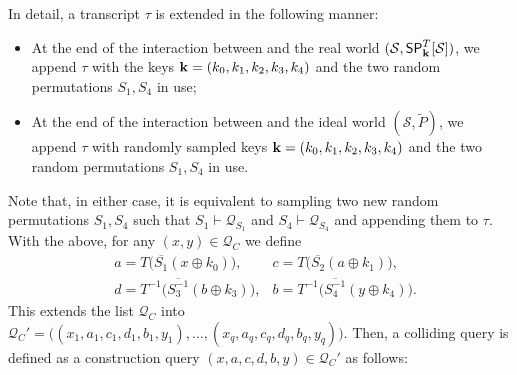 In detail, a transcript $\tau$ is extended in the following manner:
\begin{itemize}
	\item At the end of the interaction between \dis and the real world $(\mathcal{S},\mathsf{SP}_{\mathbf{k}}^T[\mathcal{S}])$, we append $\tau$ with the keys $\mathbf{k}=(k_0,k_1,k_2,k_3,k_4)$ and the two random permutations $S_1,S_4$ in use;
	\item At the end of the interaction between \dis and the ideal world $(\mathcal{S},\widetilde{P})$, we append $\tau$ with randomly sampled keys $\mathbf{k}=(k_0,k_1,k_2,k_3,k_4)$ and the two random permutations $S_1,S_4$ in use.
\end{itemize}
Note that, in either case, it is equivalent to sampling two new random permutations $S_1,S_4$ such that $S_1\vdash\mathcal{Q}_{S_{1}}$ and $S_4\vdash\mathcal{Q}_{S_4}$ and appending them to $\tau$. With the above, for any $(x,y)\in\mathcal{Q}_C$ we define
%
\begin{align*}
&a=T\big(\overline{S_1}\left(x \oplus k_{0}\right)\big),  
&c=T\big(\overline{S_2}\left(a \oplus k_1\right)\big),              \\
&d=T^{-1}\big(\overline{S_3^{-1}}\left(b \oplus k_3\right)\big), 
&b=T^{-1}\big(\overline{S_{4}^{-1}}\left(y \oplus k_{4}\right)\big).
\end{align*}
%
This extends the list $\mathcal{Q}_C$ into
$\mathcal{Q}_C'=\big((x_1,a_1,c_1,d_1,b_1,y_1),\ldots,(x_q,a_q,c_q,d_q,b_q,y_q)\big)$. Then, a colliding query is defined as a construction query $(x,a,c,d,b,y)\in\mathcal{Q}_C'$ as follows:
%
